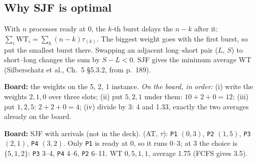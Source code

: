 \documentclass[11pt]{article}
\begin{document}
\begin{center}
\end{center}

\subsection*{Why SJF is optimal}

With $n$ processes ready at 0, the $k$-th burst delays the $n-k$ after it: $\sum_i \mathrm{WT}_i = \sum_k (n-k)\tau_{(k)}$. The biggest weight goes with the first burst, so put the smallest burst there. Swapping an adjacent long--short pair ($L$, $S$) to short--long changes the sum by $S - L < 0$. SJF gives the minimum average WT (Silberschatz et al., Ch.~5 \S5.3.2, from p.~189).

\textbf{Board:} the weights on the 5, 2, 1 instance. \emph{On the board, in order:} (i) write the weights $2, 1, 0$ over three slots; (ii) put $5, 2, 1$ under them: $10 + 2 + 0 = 12$; (iii) put $1, 2, 5$: $2 + 2 + 0 = 4$; (iv) divide by 3: 4 and 1.33, exactly the two averages already on the board.

\textbf{Board:} SJF with arrivals (not in the deck). (AT, $\tau$): \texttt{P1} $(0,3)$, \texttt{P2} $(1,5)$, \texttt{P3} $(2,1)$, \texttt{P4} $(3,2)$. Only \texttt{P1} is ready at 0, so it runs 0--3; at 3 the choice is $\{5, 1, 2\}$: \texttt{P3} 3--4, \texttt{P4} 4--6, \texttt{P2} 6--11. WT $0, 5, 1, 1$, average 1.75 (FCFS gives 3.5).
\end{document}
